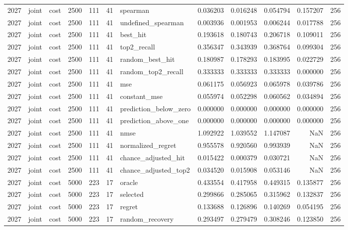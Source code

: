 \begin{tabular}{rllrrrlrrrrr}
2027 & joint & cost & 2500 & 111 & 41 & spearman & 0.036203 & 0.016248 & 0.054794 & 0.157207 & 256 \\
2027 & joint & cost & 2500 & 111 & 41 & undefined_spearman & 0.003936 & 0.001953 & 0.006244 & 0.017788 & 256 \\
2027 & joint & cost & 2500 & 111 & 41 & best_hit & 0.193618 & 0.180743 & 0.206718 & 0.109011 & 256 \\
2027 & joint & cost & 2500 & 111 & 41 & top2_recall & 0.356347 & 0.343939 & 0.368764 & 0.099304 & 256 \\
2027 & joint & cost & 2500 & 111 & 41 & random_best_hit & 0.180987 & 0.178293 & 0.183995 & 0.022729 & 256 \\
2027 & joint & cost & 2500 & 111 & 41 & random_top2_recall & 0.333333 & 0.333333 & 0.333333 & 0.000000 & 256 \\
2027 & joint & cost & 2500 & 111 & 41 & mse & 0.061175 & 0.056923 & 0.065978 & 0.039786 & 256 \\
2027 & joint & cost & 2500 & 111 & 41 & constant_mse & 0.055974 & 0.052298 & 0.060562 & 0.034894 & 256 \\
2027 & joint & cost & 2500 & 111 & 41 & prediction_below_zero & 0.000000 & 0.000000 & 0.000000 & 0.000000 & 256 \\
2027 & joint & cost & 2500 & 111 & 41 & prediction_above_one & 0.000000 & 0.000000 & 0.000000 & 0.000000 & 256 \\
2027 & joint & cost & 2500 & 111 & 41 & nmse & 1.092922 & 1.039552 & 1.147087 & NaN & 256 \\
2027 & joint & cost & 2500 & 111 & 41 & normalized_regret & 0.955578 & 0.920560 & 0.993939 & NaN & 256 \\
2027 & joint & cost & 2500 & 111 & 41 & chance_adjusted_hit & 0.015422 & 0.000379 & 0.030721 & NaN & 256 \\
2027 & joint & cost & 2500 & 111 & 41 & chance_adjusted_top2 & 0.034520 & 0.015908 & 0.053146 & NaN & 256 \\
2027 & joint & cost & 5000 & 223 & 17 & oracle & 0.433554 & 0.417958 & 0.449315 & 0.135877 & 256 \\
2027 & joint & cost & 5000 & 223 & 17 & selected & 0.299866 & 0.285065 & 0.315962 & 0.132837 & 256 \\
2027 & joint & cost & 5000 & 223 & 17 & regret & 0.133688 & 0.126896 & 0.140269 & 0.054195 & 256 \\
2027 & joint & cost & 5000 & 223 & 17 & random_recovery & 0.293497 & 0.279479 & 0.308246 & 0.123850 & 256 \\

\end{tabular}
